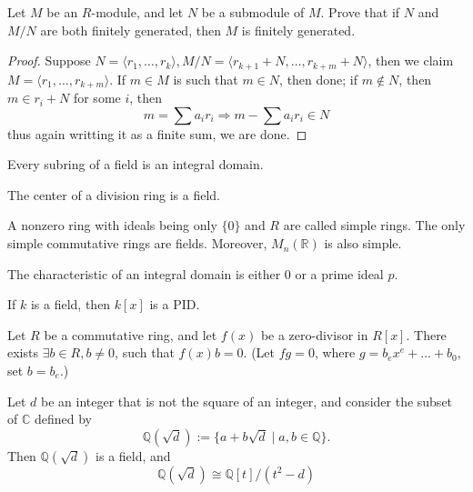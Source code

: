 \documentclass[openany]{book}
\newcommand{\R}{\mathbb{R}}
\newcommand{\la}{\langle}
\newcommand{\ra}{\rangle}
\begin{document}
\begin{prob}[6.18]
    Let \( M \) be an \( R \)-module, and let \( N \) be a submodule of \( M \). Prove that if \( N \) and \( M/N \) are both finitely generated, then \( M \) is finitely generated.
\end{prob}
\begin{proof}
    Suppose $N=\la r_1,\dots, r_k\ra, M/N=\la r_{k+1}+N,\dots, r_{k+m}+N\ra$, then we claim $M=\la r_1,\dots, r_{k+m}\ra$. If $m\in M$ is such that $m\in N$, then done; if $m\not\in N$, then $m\in r_i+N$ for some $i$, then 
    \begin{equation*}
        m=\sum a_ir_i\Rightarrow m-\sum a_ir_i\in N
    \end{equation*}
    thus again writting it as a finite sum, we are done.
\end{proof}



\begin{prop}[2.8]
    Every subring of a field is an integral domain.
\end{prop}

\begin{prop}[2.9]
    The center of a division ring is a field.
\end{prop}

\begin{prop}[3.9]
    A nonzero ring with ideals being only $\{0\}$ and $R$ are called simple rings. The only simple commutative rings are fields. Moreover, $M_n(\R)$ is also simple.
\end{prop}

\begin{prop}[3.14]
    The characteristic of an integral domain is either $0$ or a prime ideal $p$.
\end{prop}


\begin{prop}[4.4]
    If $k$ is a field, then $k[x]$ is a PID.
\end{prop}



\begin{prop}[4.9]
    Let \( R \) be a commutative ring, and let \( f(x) \) be a zero-divisor in \( R[x] \). There exists \( \exists b \in R, b \neq 0 \), such that \( f(x)b = 0 \). (Let $fg=0$, where $g=b_ex^e+\dots+b_0$, set $b=b_e$.)
\end{prop}



\begin{prop}[4.10]
    Let \( d \) be an integer that is not the square of an integer, and consider the subset of \( \mathbb{C} \) defined by 
    \[ \mathbb{Q}(\sqrt{d}) := \{a + b\sqrt{d} \mid a, b \in \mathbb{Q}\}. \]
    Then \( \mathbb{Q}(\sqrt{d}) \) is a field, and \[ \mathbb{Q}(\sqrt{d}) \cong \mathbb{Q}[t]/(t^2 - d) \]
\end{prop}
\end{document}
